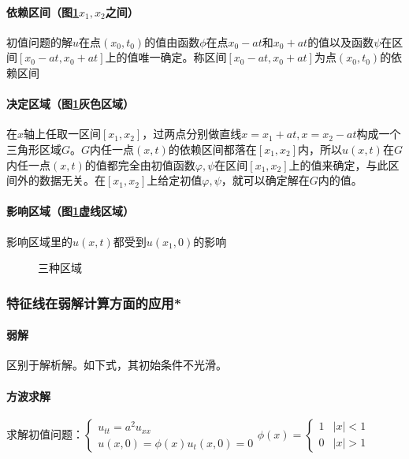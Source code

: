 \paragraph{依赖区间（图\ref{pic:area}\(x_1,x_2\)之间）}初值问题的解\(u\)在点\((x_0,t_0)\)的值由函数\(\phi\)在点\(x_0-at\)和\(x_0+at\)的值以及函数\(\psi\)在区间\([x_0-at,x_0+at]\)上的值唯一确定。称区间\([x_0-at,x_0+at]\)为点\((x_0,t_0)\)的依赖区间

\paragraph{决定区域（图\ref{pic:area}灰色区域）}在\(x\)轴上任取一区间\([x_1,x_2]\)，过两点分别做直线\(x=x_1+at,x=x_2-at\)构成一个三角形区域\(G\)。\(G\)内任一点\((x,t)\)的依赖区间都落在\([x_1,x_2]\)内，所以\(u(x,t)\)在\(G\)内任一点\((x,t)\)的值都完全由初值函数\(\varphi,\psi\)在区间\([x_1,x_2]\)上的值来确定，与此区间外的数据无关。在\([x_1,x_2]\)上给定初值\(\varphi,\psi\)，就可以确定解在\(G\)内的值。

\paragraph{影响区域（图\ref{pic:area}虚线区域）}影响区域里的\(u(x,t)\)都受到\(u(x_1,0)\)的影响

\begin{figure}[htbp]
    \centering
    \caption{三种区域}\label{pic:area}
\end{figure}

\subsubsection{特征线在弱解计算方面的应用*}

\paragraph{弱解}区别于解析解。如下式，其初始条件不光滑。

\paragraph{方波求解}求解初值问题：\(\begin{cases}u_{tt}=a^2u_{xx}\\u(x,0)=\phi(x)u_t(x,0)=0\end{cases}\phi(x)=\begin{cases}1&|x|<1\\0&|x|>1\end{cases}\)

